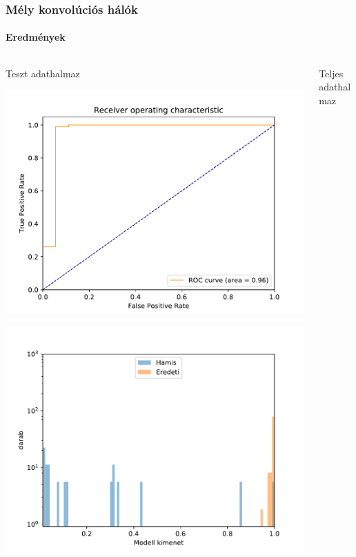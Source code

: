 \documentclass[11pt]{beamer}
\begin{document}
\begin{frame}
	\frametitle{Mély konvolúciós hálók}
	\framesubtitle{Eredmények}
	
	
	
	
	
	\begin{columns} [t]
		\begin{column}{.5\textwidth}
			\centering
			Teszt adathalmaz
			
			\includegraphics[scale=0.25]{ruc-curve-test-ujratanitva.pdf}
			
			\includegraphics[scale=0.25]{histogram-ujratanitott-log-skala-test.pdf}
			
		\end{column}
		\begin{column}{.5\textwidth}
			\centering
			Teljes adathalmaz
			

\end{column}
\end{columns}
\end{frame}
\end{document}
